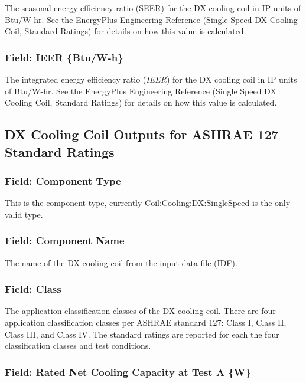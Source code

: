 The seasonal energy efficiency ratio (SEER) for the DX cooling coil in IP units of Btu/W-hr. See the EnergyPlus Engineering Reference (Single Speed DX Cooling Coil, Standard Ratings) for details on how this value is calculated.

\subsubsection{Field: IEER \{Btu/W-h\}}\label{field-ieer-btuw-h}

The integrated energy efficiency ratio (\emph{IEER}) for the DX cooling coil in IP units of Btu/W-hr. See the EnergyPlus Engineering Reference (Single Speed DX Cooling Coil, Standard Ratings) for details on how this value is calculated.

\subsection{DX Cooling Coil Outputs for ASHRAE 127 Standard Ratings}\label{dx-cooling-coil-outputs-for-ashrae-127-standard-ratings}

\subsubsection{Field: Component Type}\label{field-component-type-4}

This is the component type, currently Coil:Cooling:DX:SingleSpeed is the only valid type.

\subsubsection{Field: Component Name}\label{field-component-name-4}

The name of the DX cooling coil from the input data file (IDF).

\subsubsection{Field: Class}\label{field-class}

The application classification classes of the DX cooling coil. There are four application classification classes per ASHRAE standard 127: Class I, Class II, Class III, and Class IV. The standard ratings are reported for each the four classification classes and test conditions.

\subsubsection{Field: Rated Net Cooling Capacity at Test A \{W\}}\label{field-rated-net-cooling-capacity-at-test-a-w}

